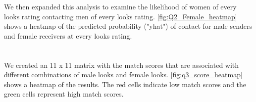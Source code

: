 
We then expanded this analysis to examine the likelihood of women of every looks rating contacting men of every looks rating.  \vref{fig:Q2_Female_heatmap} shows a heatmap of the predicted probability ("yhat") of contact for male senders and female receivers at every looks rating.


\section{} \label{sec:q3}
We created an 11 x 11 matrix with the match scores that are associated with different combinations of male looks and female looks. \vref{fig:q3_score_heatmap} shows a heatmap of the results. The red cells indicate low match scores and the green cells represent high match scores. 

